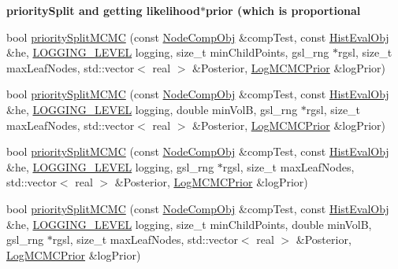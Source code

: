 \begin{Indent}{\bf priority\-Split and getting likelihood$\ast$prior (which is proportional}
\begin{DoxyCompactItemize}
\item 
bool \hyperlink{classsubpavings_1_1AdaptiveHistogram_ab38788117602e87f4e53a72b6c62747a}{priority\-Split\-M\-C\-M\-C} (const \hyperlink{classsubpavings_1_1NodeCompObj}{\-Node\-Comp\-Obj} \&comp\-Test, const \hyperlink{classsubpavings_1_1HistEvalObj}{\-Hist\-Eval\-Obj} \&he, \hyperlink{namespacesubpavings_aef8e51096b59ecaf1a1e9b2ee24b6089}{\-L\-O\-G\-G\-I\-N\-G\-\_\-\-L\-E\-V\-E\-L} logging, size\-\_\-t min\-Child\-Points, gsl\-\_\-rng $\ast$rgsl, size\-\_\-t max\-Leaf\-Nodes, std\-::vector$<$ real $>$ \&\-Posterior, \hyperlink{classsubpavings_1_1LogMCMCPrior}{\-Log\-M\-C\-M\-C\-Prior} \&log\-Prior)
\item 
bool \hyperlink{classsubpavings_1_1AdaptiveHistogram_ab8e2052a043fc9969084719da4338678}{priority\-Split\-M\-C\-M\-C} (const \hyperlink{classsubpavings_1_1NodeCompObj}{\-Node\-Comp\-Obj} \&comp\-Test, const \hyperlink{classsubpavings_1_1HistEvalObj}{\-Hist\-Eval\-Obj} \&he, \hyperlink{namespacesubpavings_aef8e51096b59ecaf1a1e9b2ee24b6089}{\-L\-O\-G\-G\-I\-N\-G\-\_\-\-L\-E\-V\-E\-L} logging, double min\-Vol\-B, gsl\-\_\-rng $\ast$rgsl, size\-\_\-t max\-Leaf\-Nodes, std\-::vector$<$ real $>$ \&\-Posterior, \hyperlink{classsubpavings_1_1LogMCMCPrior}{\-Log\-M\-C\-M\-C\-Prior} \&log\-Prior)
\item 
bool \hyperlink{classsubpavings_1_1AdaptiveHistogram_af6cd725ab063a5c3af80d42315d99ddc}{priority\-Split\-M\-C\-M\-C} (const \hyperlink{classsubpavings_1_1NodeCompObj}{\-Node\-Comp\-Obj} \&comp\-Test, const \hyperlink{classsubpavings_1_1HistEvalObj}{\-Hist\-Eval\-Obj} \&he, \hyperlink{namespacesubpavings_aef8e51096b59ecaf1a1e9b2ee24b6089}{\-L\-O\-G\-G\-I\-N\-G\-\_\-\-L\-E\-V\-E\-L} logging, gsl\-\_\-rng $\ast$rgsl, size\-\_\-t max\-Leaf\-Nodes, std\-::vector$<$ real $>$ \&\-Posterior, \hyperlink{classsubpavings_1_1LogMCMCPrior}{\-Log\-M\-C\-M\-C\-Prior} \&log\-Prior)
\item 
bool \hyperlink{classsubpavings_1_1AdaptiveHistogram_a5e8e56baf547e75fe1701b455fa92efb}{priority\-Split\-M\-C\-M\-C} (const \hyperlink{classsubpavings_1_1NodeCompObj}{\-Node\-Comp\-Obj} \&comp\-Test, const \hyperlink{classsubpavings_1_1HistEvalObj}{\-Hist\-Eval\-Obj} \&he, \hyperlink{namespacesubpavings_aef8e51096b59ecaf1a1e9b2ee24b6089}{\-L\-O\-G\-G\-I\-N\-G\-\_\-\-L\-E\-V\-E\-L} logging, size\-\_\-t min\-Child\-Points, double min\-Vol\-B, gsl\-\_\-rng $\ast$rgsl, size\-\_\-t max\-Leaf\-Nodes, std\-::vector$<$ real $>$ \&\-Posterior, \hyperlink{classsubpavings_1_1LogMCMCPrior}{\-Log\-M\-C\-M\-C\-Prior} \&log\-Prior)
\end{DoxyCompactItemize}
\end{Indent}

